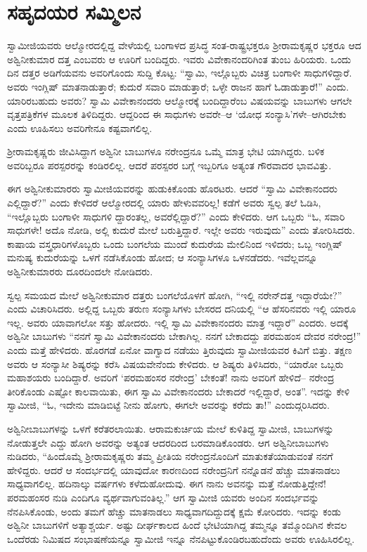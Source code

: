 
\chapter{ಸಹೃದಯರ ಸಮ್ಮಿಲನ}

\noindent

ಸ್ವಾಮೀಜಿಯವರು ಆಲ್ಮೋರದಲ್ಲಿದ್ದ ವೇಳೆಯಲ್ಲಿ ಬಂಗಾಳದ ಪ್ರಸಿದ್ಧ ಸಂತ-ರಾಷ್ಟ್ರಭಕ್ತರೂ ಶ್ರೀರಾಮಕೃಷ್ಣರ ಭಕ್ತರೂ ಆದ ಅಶ್ವಿನೀಕುಮಾರ ದತ್ತ ಎಂಬವರು ಆ ಊರಿಗೆ ಬಂದಿದ್ದರು. ಇವರು ವಿವೇಕಾನಂದರಿಗಿಂತ ತುಂಬ ಹಿರಿಯರು. ಒಂದು ದಿನ ದತ್ತರ ಅಡಿಗೆಯವನು ಅವರಿಗೊಂದು ಸುದ್ದಿ ಕೊಟ್ಟ: “ಸ್ವಾಮಿ, ಇಲ್ಲೊಬ್ಬರು ವಿಚಿತ್ರ ಬಂಗಾಳೀ ಸಾಧುಗಳಿದ್ದಾರೆ. ಅವರು ಇಂಗ್ಲಿಷ್ ಮಾತನಾಡುತ್ತಾರೆ; ಕುದುರೆ ಸವಾರಿ ಮಾಡುತ್ತಾರೆ; ಒಳ್ಳೇ ರಾಜನ ಹಾಗೆ ಓಡಾಡುತ್ತಾರೆ!” ಎಂದು. ಯಾರಿರಬಹುದು ಅವರು? ಸ್ವಾಮಿ ವಿವೇಕಾನಂದರು ಆಲ್ಮೋರಕ್ಕೆ ಬಂದಿದ್ದಾರೆಂಬ ವಿಷಯವನ್ನು ಬಾಬುಗಳು ಆಗಲೇ ವೃತ್ತಪತ್ರಿಕೆಗಳ ಮೂಲಕ ತಿಳಿದಿದ್ದರು. ಆದ್ದರಿಂದ ಈ ಸಾಧುಗಳು ಅವರೇ–ಆ ‘ಯೋಧ ಸಂನ್ಯಾಸಿ’ಗಳೇ–ಆಗಿರಬೇಕು ಎಂದು ಊಹಿಸಲು ಅವರಿಗೇನೂ ಕಷ್ಟವಾಗಲಿಲ್ಲ.

ಶ್ರೀರಾಮಕೃಷ್ಣರು ಜೀವಿಸಿದ್ದಾಗ ಅಶ್ವಿನೀ ಬಾಬುಗಳೂ ನರೇಂದ್ರನೂ ಒಮ್ಮೆ ಮಾತ್ರ ಭೇಟಿ ಯಾಗಿದ್ದರು. ಬಳಿಕ ಅವರಿಬ್ಬರೂ ಪರಸ್ಪರರನ್ನು ಕಂಡಿರಲಿಲ್ಲ. ಆದರೆ ಪರಸ್ಪರರ ಬಗ್ಗೆ ಇಬ್ಬರಿಗೂ ಅತ್ಯಂತ ಗೌರವಾದರ ಭಾವವಿತ್ತು.

ಈಗ ಅಶ್ವಿನೀಕುಮಾರರು ಸ್ವಾಮೀಜಿಯವರನ್ನು ಹುಡುಕಿಕೊಂಡು ಹೊರಟರು. ಆದರೆ “ಸ್ವಾಮಿ ವಿವೇಕಾನಂದರು ಎಲ್ಲಿದ್ದಾರೆ?” ಎಂದು ಕೇಳಿದರೆ ಆಲ್ಮೋರದಲ್ಲಿ ಯಾರು ಹೇಳುವವರಿಲ್ಲ! ಕಡೆಗೆ ಅವರು ಸ್ವಲ್ಪ ತಲೆ ಓಡಿಸಿ, “ಇಲ್ಲೊಬ್ಬರು ಬಂಗಾಳೀ ಸಾಧುಗಳಿ ದ್ದಾರಂತಲ್ಲ, ಅವರೆಲ್ಲಿದ್ದಾರೆ?” ಎಂದು ಕೇಳಿದರು. ಆಗ ಒಬ್ಬರು “ಓ, ಸವಾರಿ ಸಾಧುಗಳೇ! ಅದೊ ನೋಡಿ, ಅಲ್ಲಿ ಕುದುರೆ ಮೇಲೆ ಬರುತ್ತಿದ್ದಾರೆ. ಇಲ್ಲೇ ಅವರು ಇರುವುದು” ಎಂದು ತೋರಿಸಿದರು. ಕಾಷಾಯ ವಸ್ತ್ರಧಾರಿಗಳೊಬ್ಬರು ಒಂದು ಬಂಗಲೆಯ ಮುಂದೆ ಕುದುರೆಯ ಮೇಲಿನಿಂದ ಇಳಿದರು; ಒಬ್ಬ ಇಂಗ್ಲಿಷ್ ಮನುಷ್ಯ ಕುದುರೆಯನ್ನು ಒಳಗೆ ನಡೆಸಿಕೊಂಡು ಹೋದ; ಆ ಸಂನ್ಯಾಸಿಗಳೂ ಒಳನಡೆದರು. ಇವೆಲ್ಲವನ್ನೂ ಅಶ್ವಿನೀಕುಮಾರರು ದೂರದಿಂದಲೇ ನೋಡಿದರು.

ಸ್ವಲ್ಪ ಸಮಯದ ಮೇಲೆ ಅಶ್ವಿನೀಕುಮಾರ ದತ್ತರು ಬಂಗಲೆಯೊಳಗೆ ಹೋಗಿ, “ಇಲ್ಲಿ ನರೇನ್​ದತ್ತ ಇದ್ದಾರೆಯೇ?” ಎಂದು ವಿಚಾರಿಸಿದರು. ಅಲ್ಲಿದ್ದ ಒಬ್ಬರು ತರುಣ ಸಂನ್ಯಾಸಿಗಳು ಬೇಸರದ ದನಿಯಲ್ಲಿ “ಆ ಹೆಸರಿನವರು ಇಲ್ಲಿ ಯಾರೂ ಇಲ್ಲ. ಅವರು ಯಾವಾಗಲೋ ಸತ್ತು ಹೋದರು. ಇಲ್ಲಿ ಸ್ವಾಮಿ ವಿವೇಕಾನಂದರು ಮಾತ್ರ ಇದ್ದಾರೆ” ಎಂದರು. ಅದಕ್ಕೆ ಅಶ್ವಿನೀ ಬಾಬುಗಳು “ನನಗೆ ಸ್ವಾಮಿ ವಿವೇಕಾನಂದರು ಬೇಕಾಗಿಲ್ಲ. ನನಗೆ ಬೇಕಾದದ್ದು ಪರಮಹಂಸ ದೇವರ ನರೇಂದ್ರ!” ಎಂದು ಮತ್ತೆ ಹೇಳಿದರು. ಹೊರಗಡೆ ಏನೋ ವಾಗ್ವಾದ ನಡೆಯು ತ್ತಿರುವುದು ಸ್ವಾಮೀಜಿಯವರ ಕಿವಿಗೆ ಬಿತ್ತು. ತಕ್ಷಣ ಅವರು ಆ ಸಂನ್ಯಾಸೀ ಶಿಷ್ಯರನ್ನು ಕರೆಸಿ ವಿಷಯವೇನೆಂದು ಕೇಳಿದರು. ಆ ಶಿಷ್ಯರು ತಿಳಿಸಿದರು, “ಯಾರೋ ಒಬ್ಬರು ಮಹಾಶಯರು ಬಂದಿದ್ದಾರೆ. ಅವರಿಗೆ ‘ಪರಮಹಂಸರ ನರೇಂದ್ರ’ ಬೇಕಂತೆ! ನಾನು ಅವರಿಗೆ ಹೇಳಿದೆ– ನರೇಂದ್ರ ತೀರಿಕೊಂಡು ಎಷ್ಟೋ ಕಾಲವಾಯಿತು, ಈಗ ಸ್ವಾಮಿ ವಿವೇಕಾನಂದರು ಬೇಕಾದರೆ ಇಲ್ಲಿದ್ದಾರೆ, ಅಂತ”. ಇದನ್ನು ಕೇಳಿ ಸ್ವಾಮೀಜಿ, “ಓ, ಇದೇನು ಮಾಡಿಬಿಟ್ಟೆ ನೀನು ಹೋಗು, ಈಗಲೇ ಅವರನ್ನು ಕರೆದು ತಾ!” ಎಂದುದ್ಗರಿಸಿದರು.

ಅಶ್ವಿನೀಬಾಬುಗಳನ್ನು ಒಳಗೆ ಕರೆತರಲಾಯಿತು. ಆರಾಮಕುರ್ಚಿಯ ಮೇಲೆ ಕುಳಿತಿದ್ದ ಸ್ವಾಮೀಜಿ, ಬಾಬುಗಳನ್ನು ನೋಡುತ್ತಲೇ ಎದ್ದು ಹೋಗಿ ಅವರನ್ನು ಅತ್ಯಂತ ಆದರದಿಂದ ಬರಮಾಡಿಕೊಂಡರು. ಆಗ ಅಶ್ವಿನೀಬಾಬುಗಳು ನುಡಿದರು, “ಹಿಂದೊಮ್ಮೆ ಶ್ರೀರಾಮಕೃಷ್ಣರು ತಮ್ಮ ಪ್ರೀತಿಯ ನರೇಂದ್ರನೊಂದಿಗೆ ಮಾತುಕತೆಯಾಡುವಂತೆ ನನಗೆ ಹೇಳಿದ್ದರು. ಆದರೆ ಆ ಸಂದರ್ಭದಲ್ಲಿ ಯಾವುದೋ ಕಾರಣದಿಂದ ನರೇಂದ್ರನಿಗೆ ನನ್ನೊಡನೆ ಹೆಚ್ಚು ಮಾತನಾಡಲು ಸಾಧ್ಯವಾಗಲಿಲ್ಲ. ಹದಿನಾಲ್ಕು ವರ್ಷಗಳು ಕಳೆದುಹೋದುವು. ಈಗ ನಾನು ಅವನನ್ನು ಮತ್ತೆ ನೋಡುತ್ತಿದ್ದೇನೆ! ಪರಮಹಂಸರ ನುಡಿ ಎಂದಿಗೂ ವ್ಯರ್ಥವಾಗುವಂತಿಲ್ಲ.” ಆಗ ಸ್ವಾಮೀಜಿ ಯವರು ಅಂದಿನ ಸಂದರ್ಭವನ್ನು ನೆನಪಿಸಿಕೊಂಡು, ಅಂದು ತಮಗೆ ಹೆಚ್ಚು ಮಾತನಾಡಲು ಸಾಧ್ಯವಾಗದಿದ್ದುದಕ್ಕೆ ಕ್ಷಮೆ ಕೋರಿದರು. ಇದನ್ನು ಕಂಡು ಅಶ್ವಿನೀ ಬಾಬುಗಳಿಗೆ ಅತ್ಯಾಶ್ಚರ್ಯ. ಅಷ್ಟು ದೀರ್ಘಕಾಲದ ಹಿಂದೆ ಭೇಟಿಯಾಗಿದ್ದ ತಮ್ಮನ್ನೂ ತಮ್ಮೊಂದಿಗಿನ ಕೇವಲ ಒಂದೆರಡು ನಿಮಿಷದ ಸಂಭಾಷಣೆಯನ್ನೂ ಸ್ವಾಮೀಜಿ ಇನ್ನೂ ನೆನಪಿಟ್ಟುಕೊಂಡಿರಬಹುದೆಂದು ಅವರು ಊಹಿಸಿರಲಿಲ್ಲ.

